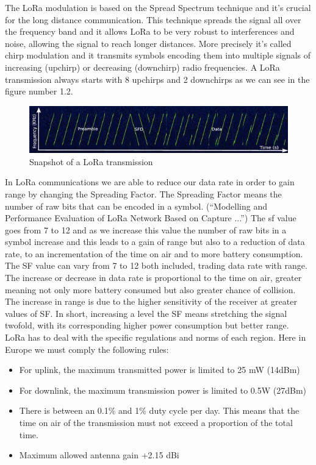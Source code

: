 The LoRa modulation is based on the Spread Spectrum technique and
it's crucial for the long distance communication. This technique spreads
the signal all over the frequency band and it allows LoRa to be very
robust to interferences and noise, allowing the signal to reach longer
distances. More precisely it's called chirp modulation and it transmits
symbols encoding them into multiple signals of increasing (upchirp) or
decreasing (downchirp) radio frequencies. A LoRa transmission always
starts with 8 upchirps and 2 downchirps as we can see in the figure
number 1.2.
\begin{figure}[htbp]
\includegraphics[width=\linewidth]{lorainitchirp.png}
\caption{Snapshot of a LoRa transmission}
\end{figure}
In LoRa communications we are able to reduce our data rate in order to
gain range by changing the Spreading Factor. The Spreading Factor
means the number of raw bits that can be encoded in a symbol.
(“Modelling and Performance Evaluation of LoRa Network Based on
Capture ...”) The \acrfull{sf} value goes from 7 to 12 and as we increase this
value the number of raw bits in a symbol increase and this leads to a
gain of range but also to a reduction of data rate, to an incrementation
of the time on air and to more battery consumption. \\
The SF value can vary from 7 to 12 both included, trading data rate with
range. The increase or decrease in data rate is proportional to the time
on air, greater meaning not only more battery consumed but also greater
chance of collision. The increase in range is due to the higher sensitivity
of the receiver at greater values of SF. In short, increasing a level the
SF means stretching the signal twofold, with its corresponding higher
power consumption but better range.\\
LoRa has to deal with the specific regulations and norms of each region.
Here in Europe we must comply the following rules:
\begin{itemize}
   \item For uplink, the maximum transmitted power is limited to 25 mW
(14dBm) 
    \item For downlink, the maximum transmission power is limited to 0.5W
(27dBm)
    \item There is between an 0.1\% and 1\% duty cycle per day. This means
            that the time on air of the transmission must not exceed a
            proportion of the total time.
    \item Maximum allowed antenna gain +2.15 dBi
\end{itemize}
